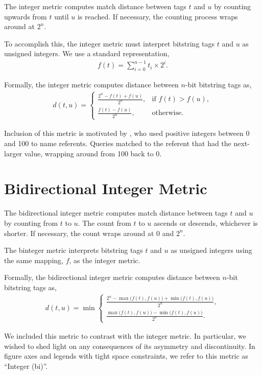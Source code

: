 The integer metric computes match distance between tags $t$ and $u$ by counting upwards from $t$ until $u$ is reached.
If necessary, the counting process wraps around at $2^n$.

To accomplish this, the integer metric must interpret bitstring tags $t$ and $u$ as unsigned integers.
We use a standard representation,
\begin{align*}
f(t)
= \sum_{i=0}^{n-1} t_i \times 2^i.
\end{align*}

Formally, the integer metric computes distance between $n$-bit bitstring tags as,
\begin{align*}
d(t, u) =
\begin{cases}
  \frac{2^n - f(t) + f(u)}{2^n}, & \text{if } f(t) > f(u), \\
  \frac{f(t) - f(u)}{2^n},         & \text{otherwise}.
\end{cases}
\end{align*}

Inclusion of this metric is motivated by \cite{spector2011tag}, who used positive integers between 0 and 100 to name referents.
Queries matched to the referent that had the next-larger value, wrapping around from 100 back to 0.

\section{Bidirectional Integer Metric} \label{sec:bidirectionalinteger}

The bidirectional integer metric computes match distance between tags $t$ and $u$ by counting from $t$ to $u$.
The count from $t$ to $u$ ascends or descends, whichever is shorter.
If necessary, the count wraps around at $0$ and $2^n$.

The binteger metric interprets bitstring tags $t$ and $u$ as unsigned integers using the same mapping, $f$, as the integer metric.

Formally, the bidirectional integer metric computes distance between $n$-bit bitstring tags as,
\begin{align*}
d(t, u) =
\min
\begin{cases}
  \frac{2^n - \max\big(f(t), f(u)\big) + \min\big(f(t), f(u)\big)}{2^n}, \\
  \frac{\max\big(f(t), f(u)\big) - \min\big(f(t), f(u)\big)}{2^n}.
\end{cases}
\end{align*}

We included this metric to contrast with the integer metric. In particular, we wished to shed light on any consequences of its asymmetry and discontinuity.
In figure axes and legends with tight space constraints, we refer to this metric as ``Integer (bi)''.


